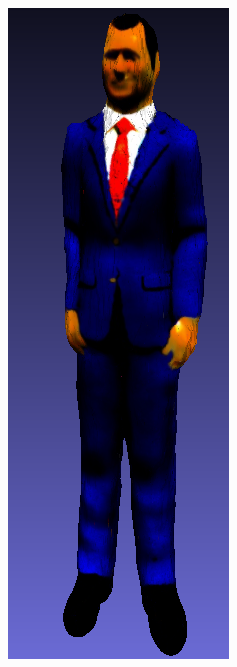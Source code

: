 \begin{figure}[H]
\begin{subfigure}[b]{0.116\textwidth}
        \caption{}
    \end{subfigure}
    \begin{subfigure}[b]{0.114\textwidth}
        \centering
        \includegraphics[width=\textwidth]{figures/future/bias_ceo_magic3d.png}

\end{subfigure}
\end{figure}
